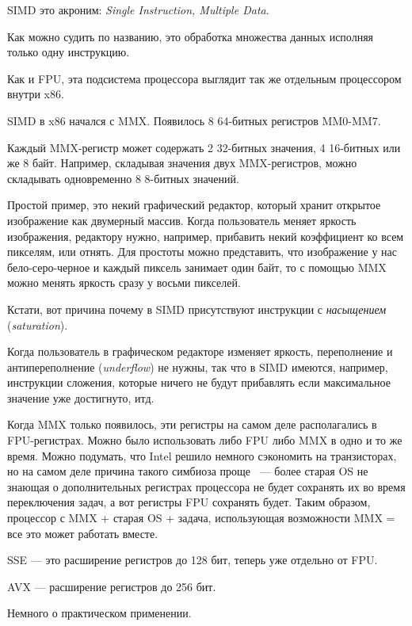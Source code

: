 
\label{SIMD_x86}
\ac{SIMD} это акроним: \emph{Single Instruction, Multiple Data}.

Как можно судить по названию, это обработка множества данных исполняя только одну инструкцию.

Как и \ac{FPU}, эта подсистема процессора выглядит так же отдельным процессором внутри x86.

SIMD в x86 начался с MMX. Появилось 8 64-битных регистров MM0-MM7.

Каждый MMX-регистр может содержать 2 32-битных значения, 4 16-битных или же 8 байт. 
Например, складывая значения двух MMX-регистров, можно складывать одновременно 8 8-битных значений.

Простой пример, это некий графический редактор, который хранит открытое изображение как двумерный массив. 
Когда пользователь меняет яркость изображения, редактору нужно, например, прибавить некий коэффициент 
ко всем пикселям, или отнять. 
Для простоты можно представить, что изображение у нас бело-серо-черное и каждый пиксель занимает один байт, 
то с помощью MMX можно менять яркость сразу у восьми пикселей.

Кстати, вот причина почему в SIMD присутствуют инструкции с \emph{насыщением} (\emph{saturation}).

Когда пользователь в графическом редакторе изменяет яркость, переполнение и антипереполнение (\emph{underflow})
не нужны, так что в SIMD имеются, например, инструкции сложения, которые ничего не будут прибавлять
если максимальное значение уже достигнуто, итд.

Когда MMX только появилось, эти регистры на самом деле располагались в FPU-регистрах. 
Можно было использовать 
либо FPU либо MMX в одно и то же время. Можно подумать, что Intel решило немного сэкономить на транзисторах, 
но на самом деле причина такого симбиоза проще ~--- более старая \ac{OS} не знающая о дополнительных 
регистрах процессора не будет сохранять их во время переключения задач, а вот регистры FPU сохранять будет. 
Таким образом, процессор с MMX + старая \ac{OS} + задача, использующая возможности MMX = все 
это может работать вместе.

SSE --- это расширение регистров до 128 бит, теперь уже отдельно от FPU.

AVX --- расширение регистров до 256 бит.

Немного о практическом применении.

